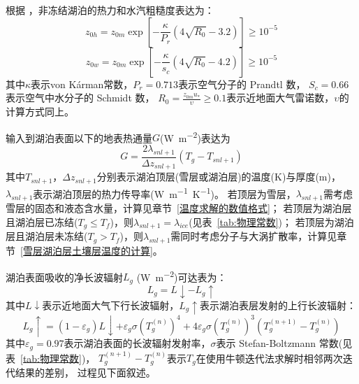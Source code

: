 根据 \citet{Zilitinkevich2001}，非冻结湖泊的热力和水汽粗糙度表达为：
\begin{equation}
z_{0 h}=z_{0 m} \exp \left[-\frac{\kappa}{P_{r}}\left(4 \sqrt{R_{0}}-3.2\right)\right] \geq 10^{-5}
\end{equation}
\begin{equation}
z_{0 w}=z_{0 m} \exp \left[-\frac{\kappa}{s_{c}}\left(4 \sqrt{R_{0}}-4.2\right)\right] \geq 10^{-5}
\end{equation}
其中$\kappa$表示von K\'arman常数，$P_r=0.713$表示空气分子的 Prandtl 数，
$S_c=0.66$表示空气中水分子的 Schmidt 数，
$R_0=\frac{z_{0m}u_\ast}{\upsilon}\geq0.1$表示近地面大气雷诺数，$\upsilon$的计算方式同上。


输入到湖泊表面以下的地表热通量$G$(\unit{W.m^{-2}})表达为
\begin{equation}
G=\frac{2 \lambda_{snl+1}}{\Delta z_{snl+1}}\left(T_{g}-T_{snl+1}\right)
\end{equation}
其中$T_{snl+1}$，$\Delta z_{snl+1}$分别表示湖泊顶层(雪层或湖泊层)的温度(K)与厚度(m)，
$\lambda_{snl+1}$表示湖泊顶层的热力传导率(\unit{W.m^{-1}.K^{-1}})。
若顶层为雪层，$\lambda_{snl+1}$需考虑雪层的固态和液态含水量，计算见章节~\ref{温度求解的数值格式}；
若顶层为湖泊层且湖泊层已冻结($T_g\le T_f$)，则$\lambda_{snl+1}=\lambda_{ice}$(见表~\ref{tab:物理常数})；
若顶层为湖泊层且湖泊层未冻结($T_g>T_f$)，则$\lambda_{snl+1}$需同时考虑分子与大涡扩散率，计算见章节~\ref{雪层湖泊层土壤层温度的计算}。


湖泊表面吸收的净长波辐射$L_g$ (\unit{W.m^{-2}})可达表为：
\begin{equation}
L_{g}=L \downarrow-L_{g} \uparrow
\end{equation}
其中$L\downarrow$表示近地面大气下行长波辐射，$L_g\uparrow$表示湖泊表层发射的上行长波辐射：
\begin{equation}
L_{g} \uparrow=\left(1-\varepsilon_{g}\right) L \downarrow+\varepsilon_{g} 
\sigma\left(T_{g}^{(n)}\right)^{4}+4 \varepsilon_{g} 
\sigma\left(T_{g}^{(n)}\right)^{3}\left(T_{g}^{(n+1)}-T_{g}^{(n)}\right)
\end{equation}
其中$\varepsilon_g=0.97$表示湖泊表面的长波辐射发射率，$\sigma$表示 Stefan-Boltzmann 常数(见表~\ref{tab:物理常数})，
$T_g^{\left(n+1\right)}-T_g^{\left(n\right)}$表示$T_g$在使用牛顿迭代法求解时相邻两次迭代结果的差别，
过程见下面叙述。


